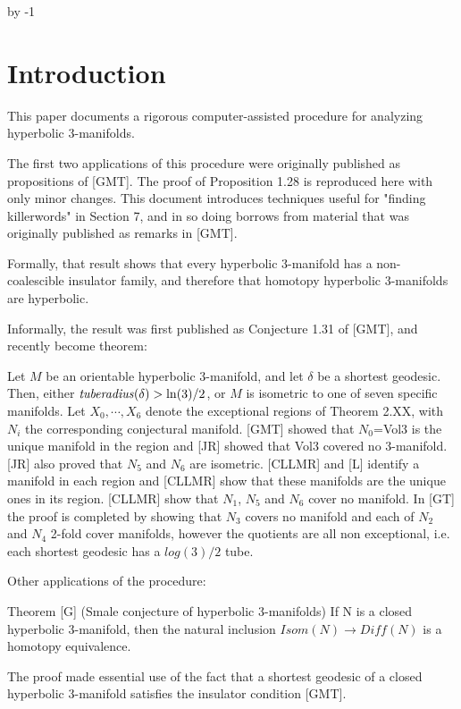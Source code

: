 \def\Arccosh{{\rm Arccosh}}
\advance\sectioncount by -1
\section{Introduction}

This paper documents a rigorous computer-assisted procedure for analyzing 
hyperbolic $3$-manifolds.

The first two applications of this procedure were originally published
as propositions of [GMT].
The proof of Proposition 1.28 is reproduced here with only minor changes.
This document introduces techniques useful for "finding killerwords" in Section 7,
and in so doing borrows from material that was originally published as remarks
in [GMT].

Formally, that result shows that
every hyperbolic $3$-manifold has a non-coalescible insulator family,
and therefore that homotopy hyperbolic $3$-manifolds are hyperbolic.

Informally, the result was first published as Conjecture 1.31 of [GMT],
and recently become theorem:

 Let $M$ be an orientable hyperbolic $3$-manifold, and let $\delta$ be
a shortest geodesic. Then, either ${\it tuberadius}(\delta) > \ln(3)/2$, or
$M$ is isometric to one of seven specific manifolds.
\endproclaim
{}
Let $X_0, \cdots, X_6$ denote the exceptional regions of Theorem 2.XX,
with $N_i$ the corresponding conjectural manifold.
[GMT] showed that $N_0$=Vol3 is the unique manifold in the region
and [JR] showed that Vol3 covered no 3-manifold.
[JR] also proved that $N_5$ and $N_6$ are isometric.
[CLLMR] and [L] identify a manifold in each region
and [CLLMR] show that these manifolds are the unique ones in its region.
[CLLMR] show that $N_1$, $N_5$ and $N_6$ cover no manifold.
In [GT] the proof is completed by showing that $N_3$ covers no manifold
and each of $N_2$ and $N_4$ 2-fold cover manifolds,
however the quotients are all non exceptional,
i.e. each shortest geodesic has a $log(3)/2$ tube.
\enddemo

Other applications of the procedure:

Theorem [G]  (Smale conjecture of hyperbolic 3-manifolds)
If N is a closed hyperbolic 3-manifold,
then the natural inclusion $Isom(N)\to Diff(N)$ is a homotopy equivalence.

The proof made essential use of the fact that a shortest geodesic
of a closed hyperbolic 3-manifold satisfies the insulator condition [GMT].

